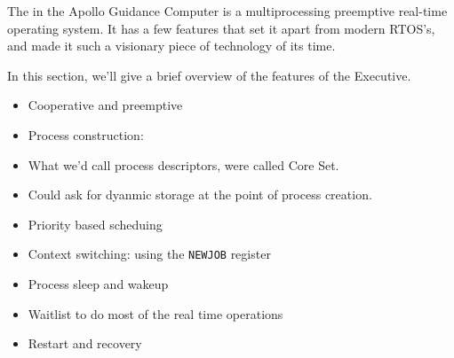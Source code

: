The  in the Apollo Guidance Computer is a multiprocessing preemptive
real-time operating system. It has a few features that set it apart from modern RTOS's,
and made it such a visionary piece of technology of its time. 

In this section, we'll give a brief overview of the features of the Executive.

\begin{itemize}
    \item Cooperative and preemptive
    \item Process construction:
        \item What we'd call process descriptors, were called Core Set. 
        \item Could ask for dyanmic storage at the point of process creation.
        \item Priority based scheduing
    \item Context switching: using the \texttt{NEWJOB} register
    \item Process sleep and wakeup
    \item Waitlist to do most of the real time operations

    \item Restart and recovery
\end{itemize}
